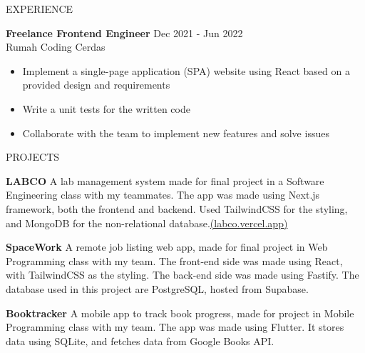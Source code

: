 \documentclass{resume} %
\begin{document}
\begin{rSection}{EXPERIENCE}

\textbf{Freelance Frontend Engineer} \hfill Dec 2021 - Jun 2022\\
Rumah Coding Cerdas 
 \begin{itemize}
    \itemsep -3pt {} 
     \item Implement a single-page application (SPA) website using React based on a provided design and  requirements
     \item Write a unit tests for the written code
    \item Collaborate with the team to implement new features and solve issues
 \end{itemize}
 

\end{rSection} 


\begin{rSection}{PROJECTS}
\vspace{-1.25em}
\item \textbf{LABCO} {A lab management system made for final project in a Software Engineering class with my teammates. The app was made using Next.js framework, both the frontend and backend. Used TailwindCSS for the styling, and MongoDB for the non-relational database.\href{https://labco.vercel.app/}{(labco.vercel.app)}}
\item \textbf{SpaceWork} {A remote job listing web app, made for final project in Web Programming class with my team. The front-end side was made using React, with TailwindCSS as the styling. The back-end side was made using Fastify. The database used in this project are PostgreSQL, hosted from Supabase.}
\item \textbf{Booktracker} {A mobile app to track book progress, made for project in Mobile Programming class with my team. The app was made using Flutter. It stores data using SQLite, and fetches data from Google Books API.}
\end{rSection} 
\end{document}
